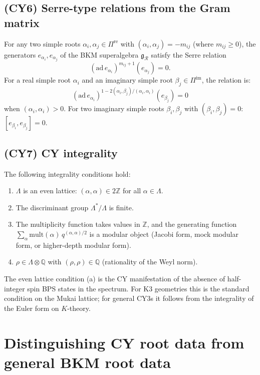 \subsection*{(CY6) Serre-type relations from the Gram matrix}

For any two simple roots $\alpha_i, \alpha_j \in \Pi^{\mathrm{re}}$ with $(\alpha_i, \alpha_j) = -m_{ij}$ (where $m_{ij} \geq 0$), the generators $e_{\alpha_i}, e_{\alpha_j}$ of the BKM superalgebra $\mathfrak{g}_\mathcal{R}$ satisfy the Serre relation
\[
 (\mathrm{ad}\, e_{\alpha_i})^{m_{ij} + 1}(e_{\alpha_j}) = 0.
\]
For a real simple root $\alpha_i$ and an imaginary simple root $\beta_j \in \Pi^{\mathrm{im}}$, the relation is:
\[
 (\mathrm{ad}\, e_{\alpha_i})^{1 - 2(\alpha_i, \beta_j)/(\alpha_i, \alpha_i)}(e_{\beta_j}) = 0
\]
when $(\alpha_i, \alpha_i) > 0$. For two imaginary simple roots $\beta_i, \beta_j$ with $(\beta_i, \beta_j) = 0$: $[e_{\beta_i}, e_{\beta_j}] = 0$.

\subsection*{(CY7) CY integrality}

The following integrality conditions hold:
\begin{enumerate}[label=(\alph*)]
 \item $\Lambda$ is an even lattice: $(\alpha, \alpha) \in 2\mathbb{Z}$ for all $\alpha \in \Lambda$.
 \item The discriminant group $\Lambda^*/\Lambda$ is finite.
 \item The multiplicity function takes values in $\mathbb{Z}$, and the generating function $\sum_\alpha \mathrm{mult}(\alpha) \, q^{(\alpha,\alpha)/2}$ is a modular object (Jacobi form, mock modular form, or higher-depth modular form).
 \item $\rho \in \Lambda \otimes \mathbb{Q}$ with $(\rho, \rho) \in \mathbb{Q}$ (rationality of the Weyl norm).
\end{enumerate}

\begin{remark}
\label{rem:cy7-even}
The even lattice condition (a) is the CY manifestation of the absence of half-integer spin BPS states in the spectrum. For K3 geometries this is the standard condition on the Mukai lattice; for general CY3s it follows from the integrality of the Euler form on $K$-theory.
\end{remark}


\section{Distinguishing CY root data from general BKM root data}
\label{sec:cy-vs-bkm}


